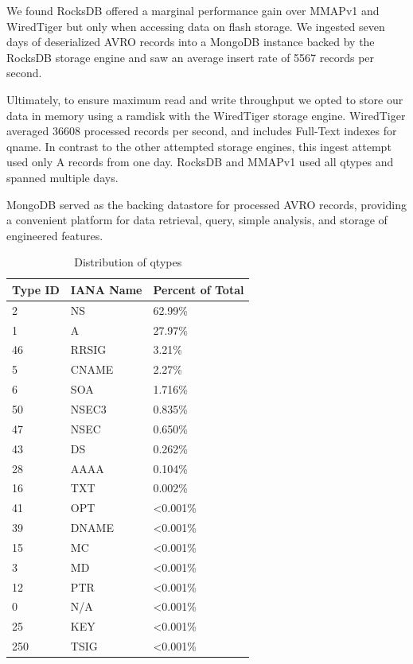 \documentclass{acm_proc_article-sp}
\begin{document}
We found RocksDB offered a marginal performance gain over MMAPv1 and WiredTiger but only when accessing data on flash storage. We ingested seven days of deserialized AVRO records into a MongoDB instance backed by the RocksDB storage engine and saw an average insert rate of 5567 records per second.

Ultimately, to ensure maximum read and write throughput we opted to store our data in memory using a ramdisk with the WiredTiger storage engine. WiredTiger averaged 36608 processed records per second, and includes Full-Text indexes for qname. In contrast to the other attempted storage engines, this ingest attempt used only A records from one day. RocksDB and MMAPv1 used all qtypes and spanned multiple days.

MongoDB served as the backing datastore for processed AVRO records, providing a convenient platform for data retrieval, query, simple analysis, and storage of engineered features. 

\begin{table}[h]
\centering
\caption{Distribution of qtypes}
\Centering
\begin{tabular}{ |p{1.7cm}|p{1.7cm}|p{1.7cm}|  }
\hline
 \hline
 {\bf Type ID}& {\bf IANA Name} & {\bf Percent of Total}\\
 \hline
 2 & NS &  62.99\% \\
 \hline
 1 & A &  27.97\% \\
 \hline
 46 & RRSIG & 3.21\% \\
 \hline
 5 & CNAME &  2.27\% \\
 \hline
 6 & SOA &   1.716\% \\
 \hline
 50 & NSEC3 &  0.835\% \\
 \hline
 47 & NSEC &  0.650\% \\
 \hline
 43 & DS &  0.262\% \\
 \hline
 28 & AAAA&  0.104\% \\
 \hline
 16 & TXT&  0.002\% \\
 \hline
 41 & OPT&  <0.001\% \\
 \hline
 39 & DNAME&  <0.001\% \\
 \hline
 15 & MC& <0.001\% \\
 \hline
 3 & MD& <0.001\% \\
 \hline
 12 & PTR& <0.001\% \\
 \hline
 0 & N/A&  <0.001\% \\
 \hline
 25 & KEY &  <0.001\% \\
 \hline
 250 & TSIG &  <0.001\% \\
\hline
\end{tabular}
\vspace{2mm}
\label{table:1}
\end{table}
\end{document}
